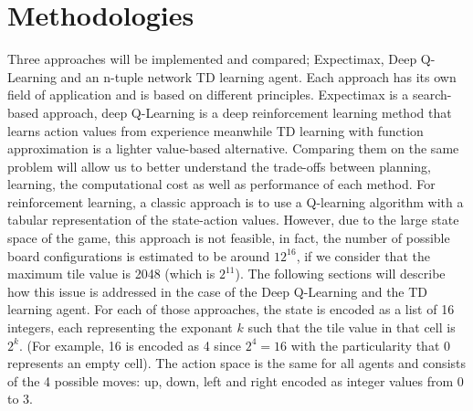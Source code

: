 \documentclass[letterpaper]{article} %
\begin{document}
\section{Methodologies}
Three approaches will be implemented and compared; Expectimax, Deep Q-Learning and an n-tuple network TD learning agent.
Each approach has its own field of application and is based on different principles.
Expectimax is a search-based approach, deep Q-Learning is a deep reinforcement learning method that learns action values from experience
meanwhile TD learning with function approximation is a lighter value-based alternative.  
Comparing them on the same problem will allow us to better understand the trade-offs between 
planning, learning, the computational cost as well as performance of each method.
For reinforcement learning, a classic approach is to use a Q-learning algorithm with a tabular representation of the state-action values. 
However, due to the large state space of the game, this approach is not feasible, in fact, 
the number of possible board configurations is estimated to be around $12^{16}$, if we consider that the maximum tile value is 2048 (which is $2^{11}$).
The following sections will describe how this issue is addressed in the case of the Deep Q-Learning and the TD learning agent.
For each of those approaches, the state is encoded as a list of 16 integers, each representing the exponant $k$ such that the tile value in that cell is
$2^k$. (For example, 16 is encoded as 4 since $2^4=16$ with the particularity that 0 represents an empty cell).
The action space is the same for all agents and consists of the 4 possible moves: up, down, left and right encoded as integer values from 0 to 3.
\end{document}
